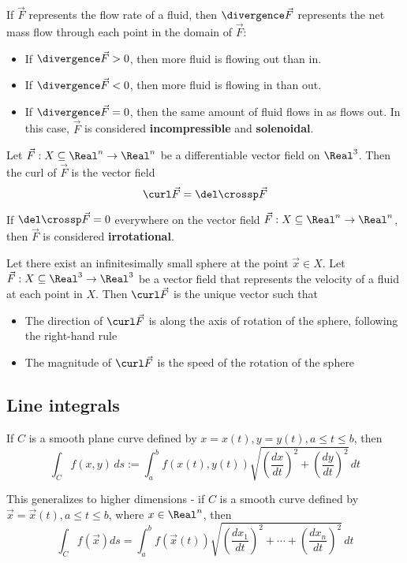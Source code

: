 \begin{lemma}
  If $\vec{F}$ represents the flow rate of a fluid, then $\divergence \vec{F}$ represents the net mass flow through each point in the domain of $\vec{F}$:
  \begin{itemize}
    \item If $\divergence \vec{F} > 0$, then more fluid is flowing out than in.
    \item If $\divergence \vec{F} < 0$, then more fluid is flowing in than out.
    \item If $\divergence \vec{F} = 0$, then the same amount of fluid flows in as flows out. In this case, $\vec{F}$ is considered \textbf{incompressible} and \textbf{solenoidal}.
  \end{itemize}
\end{lemma}

\begin{definition}[Curl]
  Let $\vec{F} : X \subseteq \Real^n \to \Real^n$ be a differentiable vector field on $\Real^3$. Then the curl of $\vec{F}$ is the vector field
  \[
    \curl \vec{F} = \del \crossp \vec{F}
  \]
\end{definition}

\begin{definition}[Irrotational]
  If $\del \crossp \vec{F} = 0$ everywhere on the vector field $\vec{F} : X \subseteq \Real^n \to \Real^n$, then $\vec{F}$ is considered \textbf{irrotational}.
\end{definition}

\begin{lemma}
  Let there exist an infinitesimally small sphere at the point $\vec{x} \in X$. Let $\vec{F} : X \subseteq \Real^3 \to \Real^3$ be a vector field that represents the velocity of a fluid at each point in $X$. Then $\curl \vec{F}$ is the unique vector such that
  \begin{itemize}
    \item The direction of $\curl \vec{F}$ is along the axis of rotation of the sphere, following the right-hand rule
    \item The magnitude of $\curl \vec{F}$ is the speed of the rotation of the sphere
  \end{itemize}
\end{lemma}

\subsection{Line integrals}

\begin{definition}
  If $C$ is a smooth plane curve defined by $x = x(t), y = y(t), a \leq t \leq b$, then
  \[
    \int_C f(x, y) \,ds := \int_a^b f(x(t), y(t)) \sqrt{\left(\frac{dx}{dt}\right)^2 + \left(\frac{dy}{dt}\right)^2} \,dt
  \]

  This generalizes to higher dimensions - if $C$ is a smooth curve defined by $\vec{x} = \vec{x}(t), a \leq t \leq b$, where $x \in \Real^n$, then
  \[
    \int_C f(\vec{x}) ds = \int_a^b f(\vec{x}(t)) \sqrt{\left(\frac{dx_1}{dt}\right)^2 + \cdots + \left(\frac{dx_n}{dt}\right)^2} \,dt
  \]
\end{definition}

